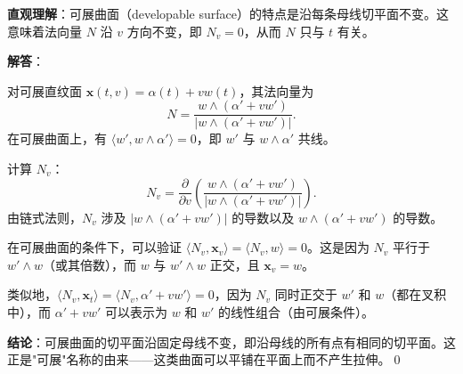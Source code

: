 \begin{solution}
\textbf{直观理解}：可展曲面（developable surface）的特点是沿每条母线切平面不变。这意味着法向量 $N$ 沿 $v$ 方向不变，即 $N_v=0$，从而 $N$ 只与 $t$ 有关。

\textbf{解答}：

对可展直纹面 $\mathbf{x}(t,v) = \alpha(t) + v w(t)$，其法向量为
\[
N = \frac{w\wedge(\alpha' + v w')}{|w\wedge(\alpha' + v w')|}.
\]
在可展曲面上，有 $\langle w', w\wedge\alpha'\rangle = 0$，即 $w'$ 与 $w\wedge\alpha'$ 共线。

计算 $N_v$：
\[
N_v = \frac{\partial}{\partial v}\left(\frac{w\wedge(\alpha' + v w')}{|w\wedge(\alpha' + v w')|}\right).
\]
由链式法则，$N_v$ 涉及 $|w\wedge(\alpha' + v w')|$ 的导数以及 $w\wedge(\alpha' + v w')$ 的导数。

在可展曲面的条件下，可以验证 $\langle N_v, \mathbf{x}_v\rangle = \langle N_v, w\rangle = 0$。这是因为 $N_v$ 平行于 $w'\wedge w$（或其倍数），而 $w$ 与 $w'\wedge w$ 正交，且 $\mathbf{x}_v = w$。

类似地，$\langle N_v, \mathbf{x}_t\rangle = \langle N_v, \alpha' + v w'\rangle = 0$，因为 $N_v$ 同时正交于 $w'$ 和 $w$（都在叉积中），而 $\alpha' + v w'$ 可以表示为 $w$ 和 $w'$ 的线性组合（由可展条件）。

\textbf{结论}：可展曲面的切平面沿固定母线不变，即沿母线的所有点有相同的切平面。这正是"可展"名称的由来——这类曲面可以平铺在平面上而不产生拉伸。\qed
\end{solution}


